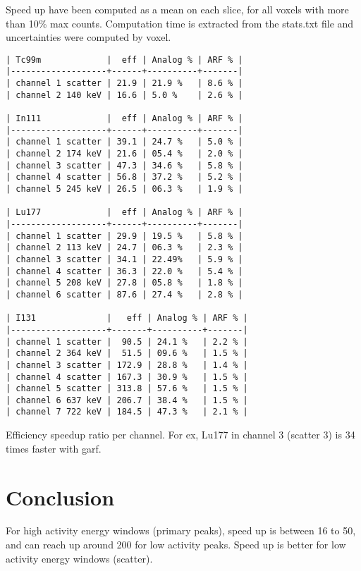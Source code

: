 \documentclass[11pt,final,a4paper]{article}
\begin{document}
Speed up have been computed as a mean on each slice, for all voxels
with more than 10\% max counts. Computation time is extracted from the
stats.txt file and uncertainties were computed by voxel.

\begin{table}[htbp]
  \centering

\begin{verbatim}
| Tc99m             |  eff | Analog % | ARF % |
|-------------------+------+----------+-------|
| channel 1 scatter | 21.9 | 21.9 %   | 8.6 % |
| channel 2 140 keV | 16.6 | 5.0 %    | 2.6 % |

| In111             |  eff | Analog % | ARF % |
|-------------------+------+----------+-------|
| channel 1 scatter | 39.1 | 24.7 %   | 5.0 % |
| channel 2 174 keV | 21.6 | 05.4 %   | 2.0 % |
| channel 3 scatter | 47.3 | 34.6 %   | 5.8 % |
| channel 4 scatter | 56.8 | 37.2 %   | 5.2 % |
| channel 5 245 keV | 26.5 | 06.3 %   | 1.9 % |

| Lu177             |  eff | Analog % | ARF % |
|-------------------+------+----------+-------|
| channel 1 scatter | 29.9 | 19.5 %   | 5.8 % |
| channel 2 113 keV | 24.7 | 06.3 %   | 2.3 % |
| channel 3 scatter | 34.1 | 22.49%   | 5.9 % |
| channel 4 scatter | 36.3 | 22.0 %   | 5.4 % |
| channel 5 208 keV | 27.8 | 05.8 %   | 1.8 % |
| channel 6 scatter | 87.6 | 27.4 %   | 2.8 % |

| I131              |   eff | Analog % | ARF % |
|-------------------+-------+----------+-------|
| channel 1 scatter |  90.5 | 24.1 %   | 2.2 % |
| channel 2 364 keV |  51.5 | 09.6 %   | 1.5 % |
| channel 3 scatter | 172.9 | 28.8 %   | 1.4 % |
| channel 4 scatter | 167.3 | 30.9 %   | 1.5 % |
| channel 5 scatter | 313.8 | 57.6 %   | 1.5 % |
| channel 6 637 keV | 206.7 | 38.4 %   | 1.5 % |
| channel 7 722 keV | 184.5 | 47.3 %   | 2.1 % |

\end{verbatim}
  
  \caption{Efficiency speedup ratio per channel. For ex, Lu177 in channel 3 (scatter 3) is 34 times faster with garf.}
  \label{tab:eff}  
\end{table}

\section{Conclusion}

For high activity energy windows (primary peaks), speed up is between
16 to 50, and can reach up around 200 for low activity peaks. Speed up
is better for low activity energy windows (scatter).



\end{document}
